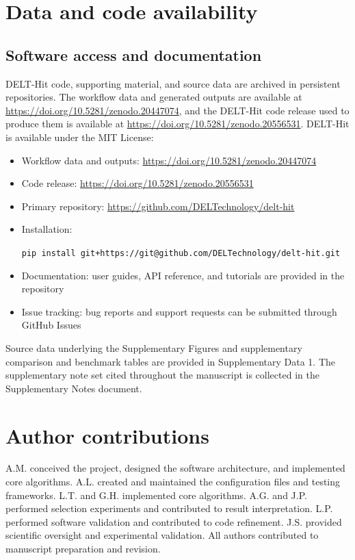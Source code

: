 \section{Data and code availability}

\subsection{Software access and documentation}
DELT-Hit code, supporting material, and source data are archived in persistent repositories. The workflow data and generated outputs are available at \url{https://doi.org/10.5281/zenodo.20447074}, and the DELT-Hit code release used to produce them is available at \url{https://doi.org/10.5281/zenodo.20556531}. DELT-Hit is available under the MIT License:

\begin{itemize}
  \item Workflow data and outputs: \url{https://doi.org/10.5281/zenodo.20447074}
  \item Code release: \url{https://doi.org/10.5281/zenodo.20556531}
  \item Primary repository: \url{https://github.com/DELTechnology/delt-hit}
  \item Installation: {\sloppy\texttt{pip install git+https://git@github.com/DELTechnology/delt-hit.git}\par}
  \item Documentation: user guides, API reference, and tutorials are provided in the repository
  \item Issue tracking: bug reports and support requests can be submitted through GitHub Issues
\end{itemize}

Source data underlying the Supplementary Figures and supplementary comparison and benchmark tables are provided in Supplementary Data 1. The supplementary note set cited throughout the manuscript is collected in the Supplementary Notes document.

\section{Author contributions}
A.M. conceived the project, designed the software architecture, and implemented core algorithms. A.L. created and maintained the configuration files and testing frameworks. L.T. and G.H. implemented core algorithms. A.G. and J.P. performed selection experiments and contributed to result interpretation. L.P. performed software validation and contributed to code refinement. J.S. provided scientific oversight and experimental validation. All authors contributed to manuscript preparation and revision.


